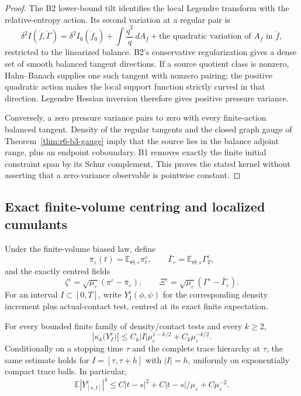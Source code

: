 \begin{proof}
The B2 lower-bound tilt identifies the local Legendre transform with the
relative-entropy action.  Its second variation at a regular pair is
\[
\delta^2I(\dot f,\dot\Gamma)=
\delta^2I_0(\dot f_0)+
\int\frac{\dot q^2}{q}\,dA_f+
\text{the quadratic variation of }A_f\text{ in }\dot f,
\]
restricted to the linearized balance.  B2's conservative regularization gives
a dense set of smooth balanced tangent directions.  If a source quotient
class is nonzero, Hahn--Banach supplies one such tangent with nonzero pairing;
the positive quadratic action makes the local support function strictly
curved in that direction.  Legendre Hessian inversion therefore gives
positive pressure variance.

Conversely, a zero pressure variance pairs to zero with every finite-action
balanced tangent.  Density of the regular tangents and the closed graph gauge
of Theorem~\ref{thm:r6-b3-gauge} imply that the source lies in the balance
adjoint range, plus an endpoint coboundary.  B1 removes exactly the finite
initial constraint span by its Schur complement.  This proves the stated
kernel without asserting that a zero-variance observable is pointwise
constant.
\end{proof}

\subsection{Exact finite-volume centring and localized cumulants}

Under the finite-volume biased law, define
\[
\bar\pi_\varepsilon(t)=
\mathbb E_{\Theta,\varepsilon}\pi_t^\varepsilon,
\qquad
\bar\Gamma_\varepsilon=
\mathbb E_{\Theta,\varepsilon}\Gamma_T^\varepsilon,
\]
and the exactly centred fields
\[
\zeta^\varepsilon=\sqrt{\mu_\varepsilon}
(\pi^\varepsilon-\bar\pi_\varepsilon),
\qquad
\Xi^\varepsilon=\sqrt{\mu_\varepsilon}
(\Gamma^\varepsilon-\bar\Gamma_\varepsilon).
\]
For an interval \(I\subset[0,T]\), write
\(Y_I^\varepsilon(\phi,\psi)\) for the corresponding density increment plus
actual-contact test, centred at its exact finite expectation.

\begin{lemma}
\label{lem:r6-b3-cumulants}
For every bounded finite family of density/contact tests and every
\(k\ge2\),
\[
\left|\kappa_k\bigl(Y_I^\varepsilon\bigr)\right|
\le C_k|I|\mu_\varepsilon^{1-k/2}
+C_k\mu_\varepsilon^{-k/2}.
\]
Conditionally on a stopping time \(\tau\) and the complete trace hierarchy at
\(\tau\), the same estimate holds for
\(I=[\tau,\tau+h]\) with \(|I|=h\), uniformly on exponentially compact trace
balls.  In particular,
\[
\mathbb E|Y_{[s,t]}^\varepsilon|^4
\le C|t-s|^2+C|t-s|/\mu_\varepsilon+C\mu_\varepsilon^{-2}.
\]
\end{lemma}

